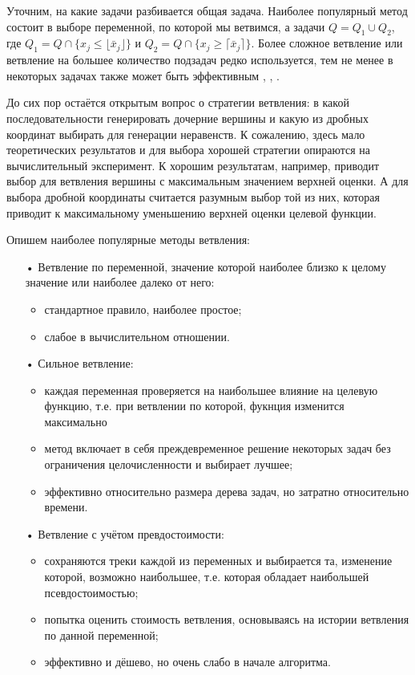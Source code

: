 \documentclass[a4paper,14pt,russian]{extreport}
\begin{document}
\par Уточним, на какие задачи разбивается общая задача. Наиболее популярный метод состоит в выборе переменной, по которой мы ветвимся, а задачи $Q = Q_1 \cup Q_2$, где $Q_1 = Q \cap \{x_j \le \lfloor \bar x_j \rfloor \}$ и $Q_2 = Q \cap \{x_j \ge \lceil \bar x_j \rceil \}$. Более сложное ветвление или ветвление на большее количество подзадач редко используется, тем не менее в некоторых задачах также может быть эффективным \cite{borndoerfer}, \cite{clochard}, \cite{naddef}.
\par До сих пор остаётся открытым вопрос о стратегии ветвления: в какой последовательности генерировать дочерние вершины и какую из дробных координат выбирать для генерации неравенств. К сожалению, здесь мало теоретических результатов и для выбора хорошей стратегии опираются на вычислительный эксперимент. К хорошим результатам, например, приводит выбор для ветвления вершины с максимальным значением верхней оценки. А для выбора дробной координаты считается разумным выбор той из них, которая приводит к максимальному уменьшению верхней оценки целевой функции. 
\par Опишем наиболее популярные методы ветвления:
  \begin{itemize}
  \item[•] Ветвление по переменной, значение которой наиболее близко к целому значение или наиболее далеко от него:
    \begin{itemize}
    \item стандартное правило, наиболее простое;
    \item слабое в вычислительном отношении. 
    \end{itemize}
  \item[•] Сильное ветвление:
    \begin{itemize} 
    \item каждая переменная проверяется на наибольшее влияние на целевую функцию, т.е. при ветвлении по которой, фукнция изменится максимально
    \item метод включает в себя преждевременное решение некоторых задач без ограничения целочисленности и выбирает лучшее;
    \item эффективно относительно размера дерева задач, но затратно относительно времени.
    \end{itemize}
  \item[•] Ветвление с учётом превдостоимости:
    \begin{itemize}
    \item сохраняются треки каждой из переменных и выбирается та, изменение которой, возможно наибольшее, т.е. которая обладает наибольшей псевдостоимостью;
    \item попытка оценить стоимость ветвления, основываясь на истории ветвления по данной переменной;
    \item эффективно и дёшево, но очень слабо в начале алгоритма.
    \end{itemize}
  \end{itemize}
\end{document}
